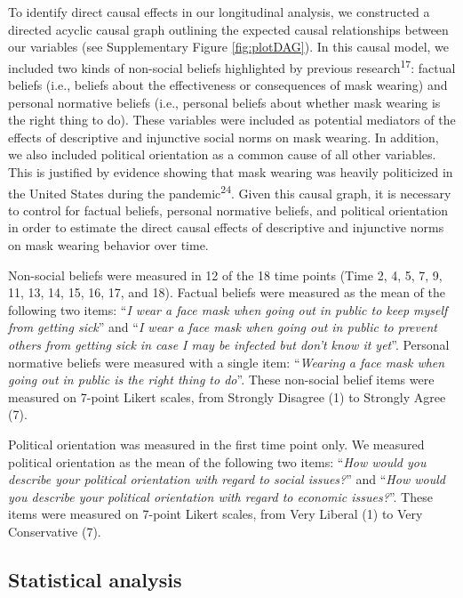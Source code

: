 \documentclass[
  man, donotrepeattitle,floatsintext]{apa6}
\begin{document}
To identify direct causal effects in our longitudinal analysis, we constructed a directed acyclic causal graph outlining the expected causal relationships between our variables (see Supplementary Figure \ref{fig:plotDAG}). In this causal model, we included two kinds of non-social beliefs highlighted by previous research\textsuperscript{17}: factual beliefs (i.e., beliefs about the effectiveness or consequences of mask wearing) and personal normative beliefs (i.e., personal beliefs about whether mask wearing is the right thing to do). These variables were included as potential mediators of the effects of descriptive and injunctive social norms on mask wearing. In addition, we also included political orientation as a common cause of all other variables. This is justified by evidence showing that mask wearing was heavily politicized in the United States during the pandemic\textsuperscript{24}. Given this causal graph, it is necessary to control for factual beliefs, personal normative beliefs, and political orientation in order to estimate the direct causal effects of descriptive and injunctive norms on mask wearing behavior over time.

Non-social beliefs were measured in 12 of the 18 time points (Time 2, 4, 5, 7, 9, 11, 13, 14, 15, 16, 17, and 18). Factual beliefs were measured as the mean of the following two items: ``\emph{I wear a face mask when going out in public to keep myself from getting sick}'' and ``\emph{I wear a face mask when going out in public to prevent others from getting sick in case I may be infected but don't know it yet}''. Personal normative beliefs were measured with a single item: ``\emph{Wearing a face mask when going out in public is the right thing to do}''. These non-social belief items were measured on 7-point Likert scales, from Strongly Disagree (1) to Strongly Agree (7).

Political orientation was measured in the first time point only. We measured political orientation as the mean of the following two items: ``\emph{How would you describe your political orientation with regard to social issues?}'' and ``\emph{How would you describe your political orientation with regard to economic issues?}''. These items were measured on 7-point Likert scales, from Very Liberal (1) to Very Conservative (7).

\hypertarget{statistical-analysis}{%
\subsection{Statistical analysis}\label{statistical-analysis}}
\end{document}
